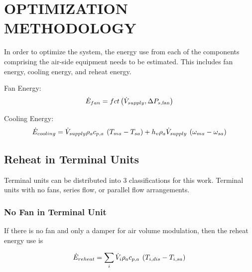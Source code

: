 %
%
%

\chapter{\MakeUppercase{Optimization Methodology}}

In order to optimize the system, the energy use from each of the components
comprising the air-side equipment needs to be estimated. This includes fan
energy, cooling energy, and reheat energy.

Fan Energy:
\begin{equation} \label{eq:FanEqnergy}
\dot E_{fan} = fct\left( {\dot{V}_{supply},\Delta {P_{s,{\rm{fan}}}}} \right)
\end{equation}

Cooling Energy:
\begin{equation} \label{eq:CoolingEnergy}
    {\dot E_{cooling}} = {\dot{V}_{supply}}\rho_a c_{p,a}\:\left( {{T_{ma}} - {T_{sa}}} \right) + h_v\rho_a{\dot{V}_{supply}}\:\left( {{\omega _{ma}} - {\omega _{sa}}} \right)
\end{equation}

\section{Reheat in Terminal Units}

Terminal units can be distributed into 3 classifications for this work.
Terminal units with no fans, series flow, or parallel flow arrangements.

\subsection{No Fan in Terminal Unit}

If there is no fan and only a damper for air volume modulation, then the reheat
energy use is

\begin{equation} \label{eq:ReheatEnergy}
    {\dot E_{reheat}} = \sum\limits_i {{\dot{V}_{i}}\rho_a c_{p,a}\:\left( {{T_{i,dis}} - {T_{i,sa}}} \right)}
\end{equation}

